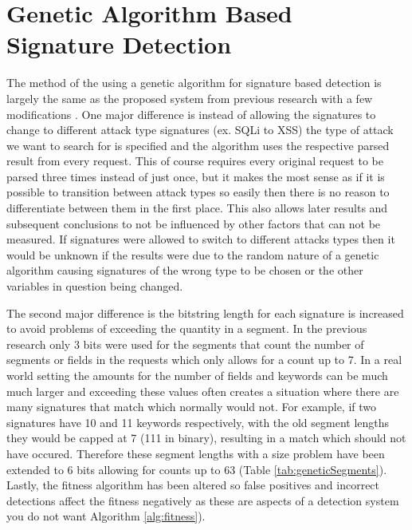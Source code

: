 \section{Genetic Algorithm Based Signature Detection}\label{sec:genIntro}

The method of the using a genetic algorithm for signature based detection is largely the same as the proposed system from previous research with a few modifications \cite{mainPaper}.  One major difference is instead of allowing the signatures to change to different attack type signatures (ex. SQLi to XSS) the type of attack we want to search for is specified and the algorithm uses the respective parsed result from every request.  This of course requires every original request to be parsed three times instead of just once, but it makes the most sense as if it is possible to transition between attack types so easily then there is no reason to differentiate between them in the first place.  This also allows later results and subsequent conclusions to not be influenced by other factors that can not be measured.  If signatures were allowed to switch to different attacks types then it would be unknown if the results were due to the random nature of a genetic algorithm causing signatures of the wrong type to be chosen or the other variables in question being changed.  

The second major difference is the bitstring length for each signature is increased to avoid problems of exceeding the quantity in a segment.  In the previous research only 3 bits were used for the segments that count the number of segments or fields in the requests which only allows for a count up to 7.  In a real world setting the amounts for the number of fields and keywords can be much much larger and exceeding these values often creates a situation where there are many signatures that match which normally would not.  For example, if two signatures have 10 and 11 keywords respectively, with the old segment lengths they would be capped at 7  (111 in binary), resulting in a match which should not have occured.  Therefore these segment lengths with a size problem have been extended to 6 bits allowing for counts up to 63 (Table \ref{tab:geneticSegments}).  Lastly, the fitness algorithm has been altered so false positives and incorrect detections affect the fitness negatively as these are aspects of a detection system you do not want Algorithm \ref{alg:fitness}).

